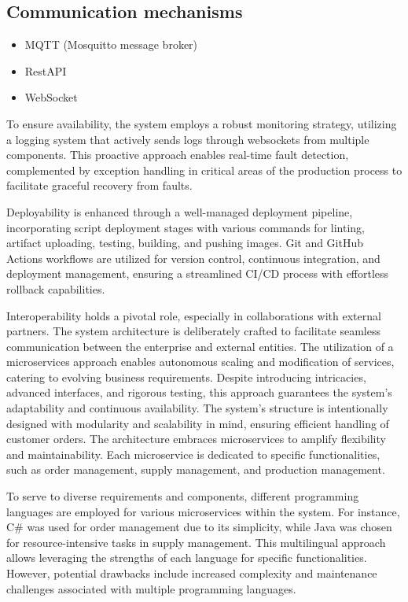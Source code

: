 \documentclass[conference]{IEEEtran}
\begin{document}
\subsection{Communication mechanisms}
\label{sec:communication-mechanisms}
\begin{itemize}
    \item MQTT (Mosquitto message broker)
    \item RestAPI
    \item WebSocket
\end{itemize}

To ensure availability, the system employs a robust monitoring strategy, utilizing a logging system that actively sends logs through websockets from multiple components. This proactive approach enables real-time fault detection, complemented by exception handling in critical areas of the production process to facilitate graceful recovery from faults.

Deployability is enhanced through a well-managed deployment pipeline, incorporating script deployment stages with various commands for linting, artifact uploading, testing, building, and pushing images. Git and GitHub Actions workflows are utilized for version control, continuous integration, and deployment management, ensuring a streamlined CI/CD process with effortless rollback capabilities.

Interoperability holds a pivotal role, especially in collaborations with external partners. The system architecture is deliberately crafted to facilitate seamless communication between the enterprise and external entities. The utilization of a microservices approach enables autonomous scaling and modification of services, catering to evolving business requirements. Despite introducing intricacies, advanced interfaces, and rigorous testing, this approach guarantees the system's adaptability and continuous availability. The system's structure is intentionally designed with modularity and scalability in mind, ensuring efficient handling of customer orders. The architecture embraces microservices to amplify flexibility and maintainability. Each microservice is dedicated to specific functionalities, such as order management, supply management, and production management.

To serve to diverse requirements and components, different programming languages are employed for various microservices within the system. For instance, C\# was used for order management due to its simplicity, while Java was chosen for resource-intensive tasks in supply management. This multilingual approach allows leveraging the strengths of each language for specific functionalities.
However, potential drawbacks include increased complexity and maintenance challenges associated with multiple programming languages.
\end{document}
